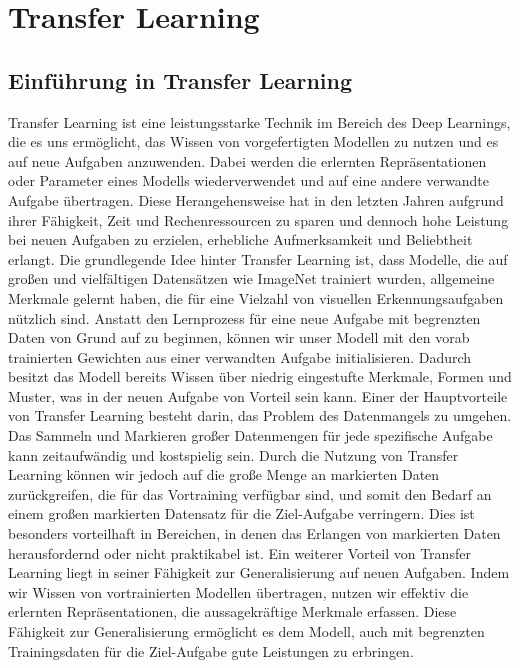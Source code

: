 \chapter{Transfer Learning}

\section{Einführung in Transfer Learning}

    Transfer Learning ist eine leistungsstarke Technik im Bereich des Deep Learnings, die es uns ermöglicht, das Wissen von vorgefertigten Modellen zu nutzen und es auf neue Aufgaben anzuwenden.
    Dabei werden die erlernten Repräsentationen oder Parameter eines Modells wiederverwendet und auf eine andere verwandte Aufgabe übertragen. 
    Diese Herangehensweise hat in den letzten Jahren aufgrund ihrer Fähigkeit, Zeit und Rechenressourcen zu sparen und dennoch hohe Leistung bei neuen Aufgaben zu erzielen, erhebliche Aufmerksamkeit und Beliebtheit erlangt.
    Die grundlegende Idee hinter Transfer Learning ist, dass Modelle, die auf großen und vielfältigen Datensätzen wie ImageNet trainiert wurden, allgemeine Merkmale gelernt haben, die für eine Vielzahl von visuellen Erkennungsaufgaben nützlich sind. 
    Anstatt den Lernprozess für eine neue Aufgabe mit begrenzten Daten von Grund auf zu beginnen, können wir unser Modell mit den vorab trainierten Gewichten aus einer verwandten Aufgabe initialisieren. 
    Dadurch besitzt das Modell bereits Wissen über niedrig eingestufte Merkmale, Formen und Muster, was in der neuen Aufgabe von Vorteil sein kann.
    Einer der Hauptvorteile von Transfer Learning besteht darin, das Problem des Datenmangels zu umgehen. 
    Das Sammeln und Markieren großer Datenmengen für jede spezifische Aufgabe kann zeitaufwändig und kostspielig sein. 
    Durch die Nutzung von Transfer Learning können wir jedoch auf die große Menge an markierten Daten zurückgreifen, die für das Vortraining verfügbar sind, und somit den Bedarf an einem großen markierten Datensatz für die Ziel-Aufgabe verringern. 
    Dies ist besonders vorteilhaft in Bereichen, in denen das Erlangen von markierten Daten herausfordernd oder nicht praktikabel ist.
    Ein weiterer Vorteil von Transfer Learning liegt in seiner Fähigkeit zur Generalisierung auf neuen Aufgaben. 
    Indem wir Wissen von vortrainierten Modellen übertragen, nutzen wir effektiv die erlernten Repräsentationen, die aussagekräftige Merkmale erfassen. 
    Diese Fähigkeit zur Generalisierung ermöglicht es dem Modell, auch mit begrenzten Trainingsdaten für die Ziel-Aufgabe gute Leistungen zu erbringen. 
